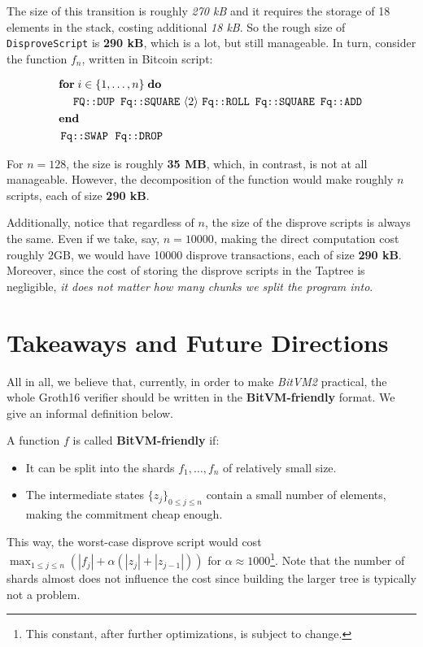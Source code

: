 \documentclass{iacrtrans}
\newcommand{\elem}[1]{\, \langle #1 \rangle \,}
\newcommand{\opcode}[1]{\, \texttt{#1} \,}
\begin{document}
The size of this transition is roughly \textit{270 kB} and it requires the
storage of 18 elements in the stack, costing additional \textit{18 kB}. So the
rough size of \texttt{DisproveScript} is \textbf{290 kB}, which is a lot, but
still manageable. In turn, consider the function $f_n$, written in Bitcoin
script:
\begin{empheqboxed}
  \begin{align*}
    &\textbf{for} \; i \in \{1,\dots,n\} \; \textbf{do} \\
    & \;\;\;\; \opcode{\texttt{FQ::DUP}} \, \opcode{\texttt{Fq::SQUARE}} \elem{2} \opcode{\texttt{Fq::ROLL}} \, \opcode{\texttt{Fq::SQUARE}} \, \opcode{\texttt{Fq::ADD}} \\
    & \textbf{end} \\
    & \opcode{\texttt{Fq::SWAP}} \; \opcode{\texttt{Fq::DROP}}
  \end{align*}
\end{empheqboxed}

For $n=128$, the size is roughly \textbf{35 MB}, which, in contrast, is not at
all manageable. However, the decomposition of the function would make roughly
$n$ scripts, each of size \textbf{290 kB}. 

Additionally, notice that regardless of $n$, the size of the disprove scripts is
always the same. Even if we take, say, $n=10000$, making the direct computation
cost roughly $2\text{GB}$, we would have 10000 disprove transactions, each of
size \textbf{290 kB}. Moreover, since the cost of storing the disprove scripts
in the Taptree is negligible, \emph{it does not matter how many chunks we split
the program into}.

\section{Takeaways and Future Directions}

All in all, we believe that, currently, in order to make \textit{BitVM2} practical, the
whole Groth16 verifier should be written in the \textbf{BitVM-friendly} format.
We give an informal definition below.

\begin{definition}
  A function $f$ is called \textbf{BitVM-friendly} if:
  \begin{itemize}
    \item It can be split into the shards $f_1,\dots,f_n$ of relatively small size.
    \item The intermediate states $\{z_j\}_{0 \leq j \leq n}$ contain a small number of elements, making the commitment cheap enough.
  \end{itemize}

  This way, the worst-case disprove script would cost $\max_{1 \leq j \leq
  n}\left(|f_j| + \alpha(|z_j| + |z_{j-1}|)\right)$ for $\alpha \approx
  1000$\footnote{This constant, after further optimizations, is subject to
  change.}. Note that the number of shards almost does not influence the cost
  since building the larger tree is typically not a problem.
\end{definition}
\end{document}
